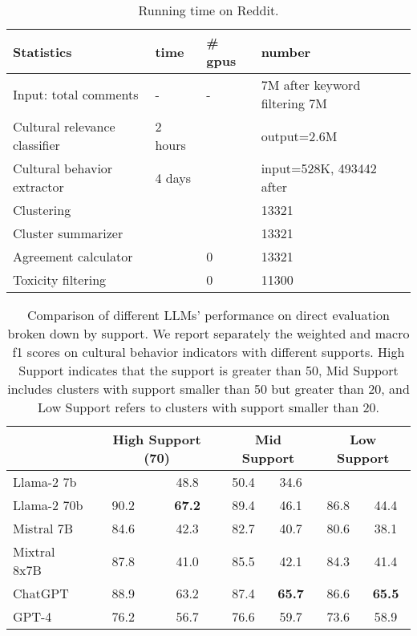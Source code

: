\begin{table}[h]
\centering
\begin{tabular}{p{4cm}|p{2cm}|p{2cm}|p{2cm}}
 \toprule
 \textbf{Statistics} & \textbf{time} &\textbf{\# gpus} & \textbf{number} \\
 \midrule
 Input: total comments & - & - & 7M after keyword filtering 7M %
 \\
 \midrule 
 Cultural relevance classifier & 2 hours &  &   output=2.6M\\
 \midrule
 Cultural behavior extractor & 4 days &  & input=528K, 493442 after \\
 \midrule
 Clustering &  &  & 13321 \\
 \midrule
 Cluster summarizer &  &  & 13321 \\
\midrule 
 Agreement calculator & & 0 & 13321 \\
\midrule
 Toxicity filtering &  & 0 & 11300 \\
\bottomrule
\end{tabular}
\caption{Running time on Reddit. \label{tab:running time and number for Reddit}}
\end{table}

\begin{table}[ht]
\centering
\begin{tabular}{lcccccc}
\toprule
& \multicolumn{2}{c}{High Support (70)} & \multicolumn{2}{c}{Mid Support} & \multicolumn{2}{c}{Low Support} \\
\midrule
Llama-2 7b & %
& 48.8 %
& 50.4 
& 34.6 \\
\midrule
Llama-2 70b & 90.2 & \textbf{67.2} & 89.4 & 46.1 & 86.8 & 44.4 \\
\midrule
Mistral 7B & 84.6 & 42.3 & 82.7 & 40.7 & 80.6 & 38.1 \\
\midrule
Mixtral 8x7B & 87.8 & 41.0 & 85.5 & 42.1 & 84.3 & 41.4 \\
\midrule
ChatGPT & 88.9 & 63.2 & 87.4 & \textbf{65.7} & 86.6 & \textbf{65.5} \\
\midrule
GPT-4 & 76.2 & 56.7 & 76.6 & 59.7 & 73.6 & 58.9 \\
\bottomrule
\end{tabular}
\caption{Comparison of different LLMs' performance on direct evaluation broken down by support. We report separately the weighted and macro f1 scores on cultural behavior indicators with different supports. High Support indicates that the support is greater than 50, Mid Support includes clusters with support smaller than 50 but greater than 20, and Low Support refers to clusters with support smaller than 20. %
}
\label{tab:direct_eval}
\end{table}

